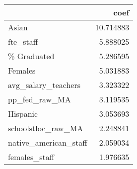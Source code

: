 \begin{tabular}{lr}
\toprule
{} &       coef \\
\midrule
Asian                 &  10.714883 \\
fte\_staff             &   5.888025 \\
\% Graduated           &   5.286595 \\
Females               &   5.031883 \\
avg\_salary\_teachers   &   3.323322 \\
pp\_fed\_raw\_MA         &   3.119535 \\
Hispanic              &   3.053693 \\
schoolstloc\_raw\_MA    &   2.248841 \\
native\_american\_staff &   2.059034 \\
females\_staff         &   1.976635 \\
\bottomrule
\end{tabular}
